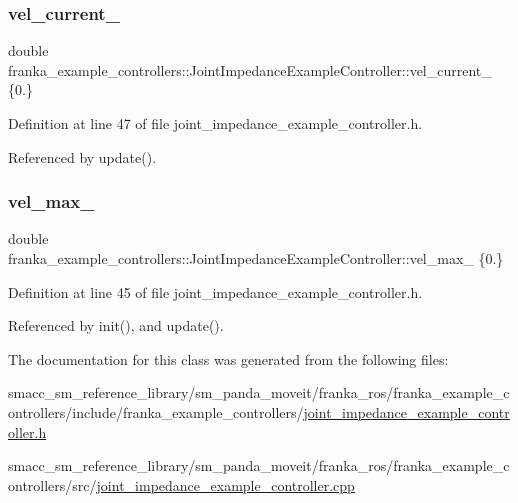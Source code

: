 \subsubsection{\texorpdfstring{vel\+\_\+current\+\_\+}{vel\_current\_}}
{\footnotesize\ttfamily double franka\+\_\+example\+\_\+controllers\+::\+Joint\+Impedance\+Example\+Controller\+::vel\+\_\+current\+\_\+ \{0.\}\hspace{0.3cm}{\ttfamily [private]}}



Definition at line 47 of file joint\+\_\+impedance\+\_\+example\+\_\+controller.\+h.



Referenced by update().

\mbox{\label{classfranka__example__controllers_1_1JointImpedanceExampleController_a6a988f0c94bef853f6771068a49f66c2}} 
\subsubsection{\texorpdfstring{vel\+\_\+max\+\_\+}{vel\_max\_}}
{\footnotesize\ttfamily double franka\+\_\+example\+\_\+controllers\+::\+Joint\+Impedance\+Example\+Controller\+::vel\+\_\+max\+\_\+ \{0.\}\hspace{0.3cm}{\ttfamily [private]}}



Definition at line 45 of file joint\+\_\+impedance\+\_\+example\+\_\+controller.\+h.



Referenced by init(), and update().



The documentation for this class was generated from the following files\+:\begin{DoxyCompactItemize}
\item 
smacc\+\_\+sm\+\_\+reference\+\_\+library/sm\+\_\+panda\+\_\+moveit/franka\+\_\+ros/franka\+\_\+example\+\_\+controllers/include/franka\+\_\+example\+\_\+controllers/\hyperlink{joint__impedance__example__controller_8h}{joint\+\_\+impedance\+\_\+example\+\_\+controller.\+h}\item 
smacc\+\_\+sm\+\_\+reference\+\_\+library/sm\+\_\+panda\+\_\+moveit/franka\+\_\+ros/franka\+\_\+example\+\_\+controllers/src/\hyperlink{joint__impedance__example__controller_8cpp}{joint\+\_\+impedance\+\_\+example\+\_\+controller.\+cpp}\end{DoxyCompactItemize}
